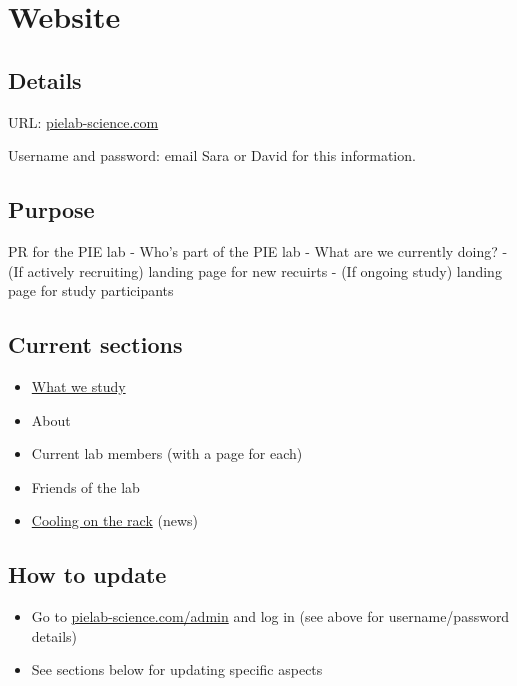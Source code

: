 \documentclass[]{book}
\providecommand{\tightlist}{%
  \setlength{\itemsep}{0pt}\setlength{\parskip}{0pt}}
\begin{document}
\hypertarget{website}{%
\section{Website}\label{website}}

\hypertarget{details}{%
\subsection{Details}\label{details}}

URL: \href{https://pielab-science.com}{pielab-science.com}

Username and password: email Sara or David for this information.

\hypertarget{purpose}{%
\subsection{Purpose}\label{purpose}}

PR for the PIE lab
- Who's part of the PIE lab
- What are we currently doing?
- (If actively recruiting) landing page for new recuirts
- (If ongoing study) landing page for study participants

\hypertarget{current-sections}{%
\subsection{Current sections}\label{current-sections}}

\begin{itemize}
\tightlist
\item
  \href{https://pielab-science.com/research}{What we study}
\item
  About
\item
  Current lab members (with a page for each)
\item
  Friends of the lab
\item
  \href{https://pielab-science.com/blog/}{Cooling on the rack} (news)
\end{itemize}

\hypertarget{how-to-update}{%
\subsection{How to update}\label{how-to-update}}

\begin{itemize}
\tightlist
\item
  Go to \href{https://pielab-science.com/admin}{pielab-science.com/admin} and log in (see above for username/password details)
\item
  See sections below for updating specific aspects
\end{itemize}
\end{document}
